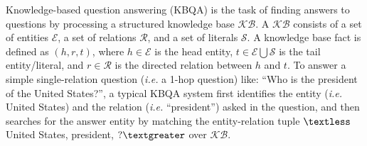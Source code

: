 Knowledge-based question answering (KBQA) is the task of finding answers to questions by processing a structured knowledge base $\mathcal{KB}$. %
A $\mathcal{KB}$ consists of a set of entities $\mathcal{E}$, a set of relations $\mathcal{R}$, and a set of literals $\mathcal{S}$. A knowledge base fact is defined as $(h,r,t)$, where $h\in \mathcal{E}$ is the head entity, $t \in \mathcal{E} \bigcup \mathcal{S}$ is the tail entity/literal, and $r\in \mathcal{R}$ is the directed relation between $h$ and $t$. To answer a simple single-relation question (\emph{i.e.} a 1-hop question) like: ``Who is the president of the United States?'', %
a typical KBQA system first identifies the entity (\emph{i.e.} United States) and the relation (\emph{i.e.} ``president'') asked in the question, and then searches for the answer entity by matching the entity-relation tuple $\textless$United States, president, $?\textgreater$ over $\mathcal{KB}$.


